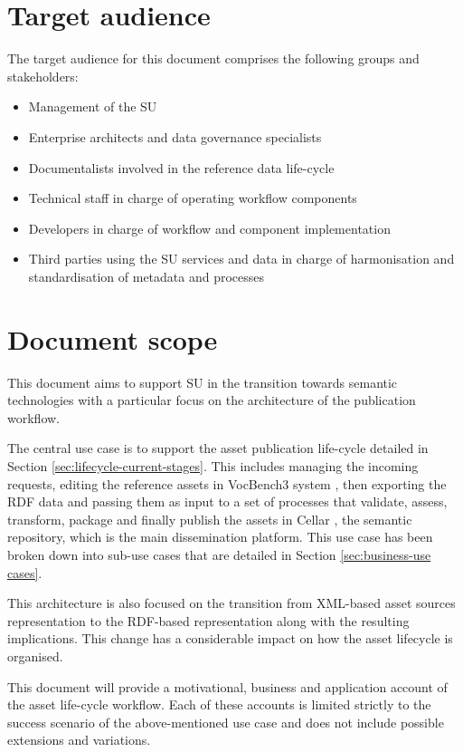 	\section{Target audience}
	\label{sec:audience}
	The target audience for this document comprises the following groups and stakeholders:	
	\begin{itemize}
		\item Management of the SU
		\item Enterprise architects and data governance specialists
		\item Documentalists involved in the reference data life-cycle
		\item Technical staff in charge of operating workflow components
		\item Developers in charge of workflow and component implementation
		\item Third parties using the SU services and data in charge of harmonisation and standardisation of metadata and processes
	\end{itemize}	
	
	\section{Document scope}
	\label{sec:scope}
	
	This document aims to support SU in the transition towards semantic technologies with a particular focus on the architecture of the publication workflow. 
	
	The central use case is to support the asset publication life-cycle detailed in Section \ref{sec:lifecycle-current-stages}. This includes managing the incoming requests, editing the reference assets in VocBench3 system \citep{stellato2017towards,stellatovocbench}, then exporting the RDF data and passing them as input to a set of processes that validate, assess, transform, package and finally publish the assets in Cellar \cite{cdm-francesconi2015ontology}, the semantic repository, which is the main dissemination platform. This use case has been broken down into sub-use cases that are detailed in Section \ref{sec:business-use cases}.
	
	This architecture is also focused on the transition from XML-based asset sources representation to the RDF-based representation along with the resulting implications. This change has a considerable impact on how the asset lifecycle is organised. 
	
	This document will provide a motivational, business and application account of the asset life-cycle workflow. Each of these accounts is limited strictly to the success scenario of the above-mentioned use case and does not include possible extensions and variations.	
	
